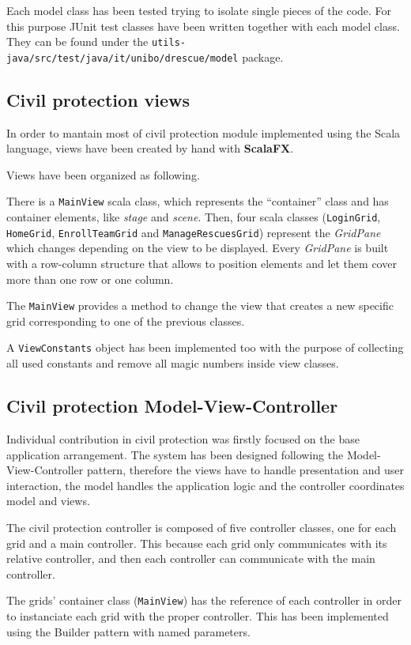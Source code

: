 \documentclass[a4paper,12pt]{report}
\begin{document}
Each model class has been tested trying to isolate single pieces of the code. For this purpose JUnit test classes have been written together with each model class. They can be found under the \texttt{utils-java/src/test/java/it/unibo/drescue/model} package.

\subsection{Civil protection views}
In order to mantain most of civil protection module implemented using the Scala language, views have been created by hand with \textbf{ScalaFX}. 

Views have been organized as following.

There is a \texttt{MainView} scala class, which represents the ``container'' class and has container elements, like \textit{stage} and \textit{scene}.
Then, four scala classes (\texttt{LoginGrid}, \texttt{HomeGrid}, \texttt{EnrollTeamGrid} and \texttt{ManageRescuesGrid}) represent the \textit{GridPane} which changes depending on the view to be displayed.
Every \textit{GridPane} is built with a row-column structure that allows to position elements and let them cover more than one row or one column.

The \texttt{MainView} provides a method to change the view that creates a new specific grid corresponding to one of the previous classes.

A \texttt{ViewConstants} object has been implemented too with the purpose of collecting all used constants and remove all magic numbers inside view classes.

\subsection{Civil protection Model-View-Controller}
Individual contribution in civil protection was firstly focused on the base application arrangement. The system has been designed following the Model-View-Controller pattern, therefore the views have to handle presentation and user interaction, the model handles the application logic and the controller coordinates model and views.

The civil protection controller is composed of five controller classes, one for each grid and a main controller. This because each grid only communicates with its relative controller, and then each controller can communicate with the main controller.

The grids' container class (\texttt{MainView}) has the reference of each controller in order to instanciate each grid with the proper controller. This has been implemented using the Builder pattern with named parameters.
\end{document}
